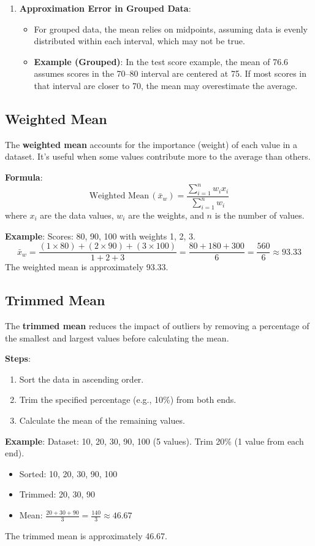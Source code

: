\documentclass[11pt]{article}
\begin{document}
\begin{enumerate}
    \item \textbf{Approximation Error in Grouped Data}:
    \begin{itemize}
        \item For grouped data, the mean relies on midpoints, assuming data is evenly distributed within each interval, which may not be true.
        \item \textbf{Example (Grouped)}: In the test score example, the mean of 76.6 assumes scores in the 70--80 interval are centered at 75. If most scores in that interval are closer to 70, the mean may overestimate the average.
    \end{itemize}
\end{enumerate}

\subsection{Weighted Mean}

The \textbf{weighted mean} accounts for the importance (weight) of each value in a dataset. It’s useful when some values contribute more to the average than others.

\textbf{Formula}:
\[
\text{Weighted Mean} \, (\bar{x}_w) = \frac{\sum_{i=1}^{n} w_i x_i}{\sum_{i=1}^{n} w_i}
\]
where $x_i$ are the data values, $w_i$ are the weights, and $n$ is the number of values.

\textbf{Example}: Scores: 80, 90, 100 with weights 1, 2, 3.
\[
\bar{x}_w = \frac{(1 \times 80) + (2 \times 90) + (3 \times 100)}{1 + 2 + 3} = \frac{80 + 180 + 300}{6} = \frac{560}{6} \approx 93.33
\]
The weighted mean is approximately 93.33.

\subsection{Trimmed Mean}

The \textbf{trimmed mean} reduces the impact of outliers by removing a percentage of the smallest and largest values before calculating the mean.

\textbf{Steps}:
\begin{enumerate}
    \item Sort the data in ascending order.
    \item Trim the specified percentage (e.g., 10\%) from both ends.
    \item Calculate the mean of the remaining values.
\end{enumerate}

\textbf{Example}: Dataset: 10, 20, 30, 90, 100 (5 values). Trim 20\% (1 value from each end).
\begin{itemize}
    \item Sorted: 10, 20, 30, 90, 100
    \item Trimmed: 20, 30, 90
    \item Mean: $\frac{20 + 30 + 90}{3} = \frac{140}{3} \approx 46.67$
\end{itemize}
The trimmed mean is approximately 46.67.
\end{document}
